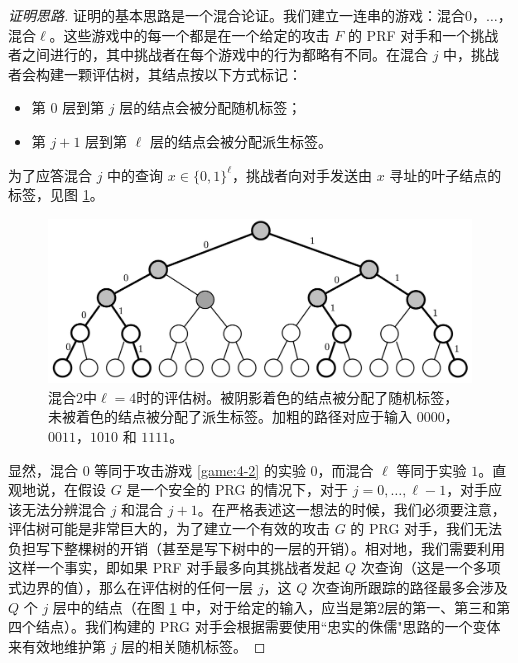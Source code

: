 \begin{proof}[证明思路]
证明的基本思路是一个混合论证。我们建立一连串的游戏：混合$0$，$\dots$，混合$\ell$。这些游戏中的每一个都是在一个给定的攻击 $F$ 的 PRF 对手和一个挑战者之间进行的，其中挑战者在每个游戏中的行为都略有不同。在混合 $j$ 中，挑战者会构建一颗评估树，其结点按以下方式标记：
\begin{itemize}
	\item 第 $0$ 层到第 $j$ 层的结点会被分配随机标签；
	\item 第 $j+1$ 层到第 $\ell$ 层的结点会被分配派生标签。
\end{itemize}
为了应答混合 $j$ 中的查询 $x\in\{0,1\}^\ell$，挑战者向对手发送由 $x$ 寻址的叶子结点的标签，见图 \ref{fig:4-16}。

\begin{figure}
  \centering
  \includegraphics[width=0.75\linewidth]{figures/chapter4/fig16.png}
  \caption{混合$2$中$\ell=4$时的评估树。被阴影着色的结点被分配了随机标签，未被着色的结点被分配了派生标签。加粗的路径对应于输入 $0000$，$0011$，$1010$ 和 $1111$。}
  \label{fig:4-16}
\end{figure}

显然，混合 $0$ 等同于攻击游戏 \ref{game:4-2} 的实验 $0$，而混合 $\ell$ 等同于实验 $1$。直观地说，在假设 $G$ 是一个安全的 PRG 的情况下，对于 $j=0,\dots,\ell-1$，对手应该无法分辨混合 $j$ 和混合 $j+1$。在严格表述这一想法的时候，我们必须要注意，评估树可能是非常巨大的，为了建立一个有效的攻击 $G$ 的 PRG 对手，我们无法负担写下整棵树的开销（甚至是写下树中的一层的开销）。相对地，我们需要利用这样一个事实，即如果 PRF 对手最多向其挑战者发起 $Q$ 次查询（这是一个多项式边界的值），那么在评估树的任何一层 $j$，这 $Q$ 次查询所跟踪的路径最多会涉及 $Q$ 个 $j$ 层中的结点（在图 \ref{fig:4-16} 中，对于给定的输入，应当是第$2$层的第一、第三和第四个结点）。我们构建的 PRG 对手会根据需要使用``忠实的侏儒"思路的一个变体来有效地维护第 $j$ 层的相关随机标签。
\end{proof}

